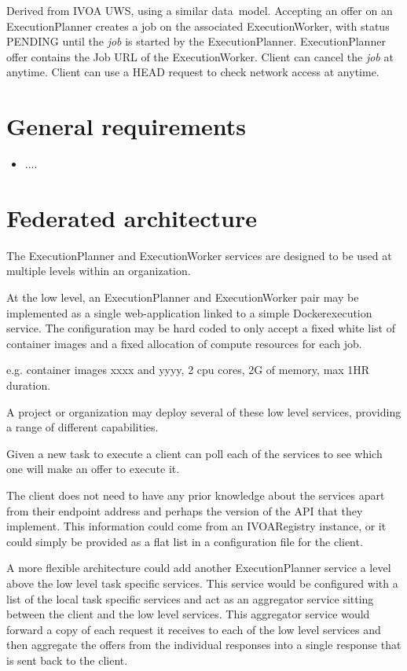 \documentclass[11pt,a4paper]{ivoa}
\newcommand{\datamodel} {data~model}
\newcommand{\ivoa} {IVOA}
\newcommand{\execplanner} {ExecutionPlanner}
\newcommand{\execworker} {ExecutionWorker}
\newcommand{\docker} {Docker}
\newcommand{\job} {\textit{job}}
\begin{document}
Derived from IVOA UWS, using a similar \datamodel{}.
Accepting an offer on an \execplanner{} creates a job on the associated \execworker{},
with status PENDING until the \job{} is started by the \execplanner{}.
\execplanner{} offer contains the Job URL of the \execworker{}.
Client can cancel the \job{} at anytime.
Client can use a HEAD request to check network access at anytime.


\pagebreak

\section{General requirements}
\label{general-requirements}

\begin{itemize}
    \item ....
\end{itemize}


\section{Federated architecture}
\label{federation}

The \execplanner{} and \execworker{} services are designed to be used at multiple levels within an organization.

At the low level, an \execplanner{} and \execworker{} pair may be implemented as a
single web-application linked to a simple \docker execution service.
The configuration may be hard coded to only accept a fixed white list of container images
and a fixed allocation of compute resources for each job.

e.g. container images xxxx and yyyy, 2 cpu cores, 2G of memory, max 1HR duration.

A project or organization may deploy several of these low level services,
providing a range of different capabilities.

Given a new task to execute a client can poll each of the services to see which one will
make an offer to execute it.

The client does not need to have any prior knowledge about the services apart from their
endpoint address and perhaps the version of the API that they implement.
This information could come from an \ivoa Registry instance, or it could simply
be provided as a flat list in a configuration file for the client.

A more flexible architecture could add another \execplanner{} service
a level above the low level task specific services.
This service would be configured with a list of the local task specific services
and act as an aggregator service sitting between the client and the low level services.
This aggregator service would forward a copy of each request it receives to each of the low level services and
then aggregate the offers from the individual responses into a single response that is sent back to the client.
\end{document}
